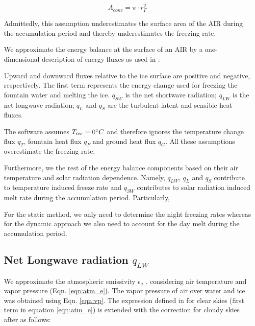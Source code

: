 \documentclass[tc, manuscript]{copernicus}
\begin{document}
\begin{equation} A_{cone} =\pi \cdot r_{F}^2 \label{eq:Area} \end{equation}

Admittedly, this assumption underestimates the surface area of the AIR during the accumulation period and
thereby underestimates the freezing rate.

We approximate the energy balance at the surface of an AIR by a one-dimensional description of energy fluxes as
used in \cite{balasubramanianInfluenceMeteorologicalConditions2022}:


Upward and downward fluxes relative to the ice surface are positive and negative, respectively. The first term
represents the energy change used for freezing the fountain water and melting the ice. $q_{SW}$ is the net
shortwave radiation; $q_{LW}$ is the net longwave radiation; $q_{L}$ and $q_{S}$ are the turbulent latent and
sensible heat fluxes. 

The software assumes $T_{ice} = 0 ^{\circ} C$ and therefore ignores the temperature change flux $q_{T}$, fountain
heat flux $q_{F}$ and ground heat flux $q_{G}$. All these assumptions overestimate the freezing rate.

Furthermore, we the rest of the energy balance components based on their air temperature and solar
radiation dependence. Namely, $q_{LW}$, $q_{L}$ and $q_{S}$ contribute to temperature induced freeze rate and
$q_{SW}$ contributes to solar radiation induced melt rate during the accumulation period.  Particularly,

For the static method, we only need to determine the night freezing rates whereas for the dynamic approach we
also need to account for the day melt during the accumulation period.

\subsection{Net Longwave radiation \texorpdfstring{$q_{LW}$}{Lg}} \label{sec:LW}

We approximate the atmospheric emissivity $\epsilon_a$ , considering air temperature and vapor pressure (Eqn.
\ref{eqn:atm_e}). The vapor pressure of air over water and ice was obtained using Eqn. \ref{eqn:vp}.  The
expression defined in \cite{brutsaertDerivableFormulaLongwave1975} for clear skies (first term in equation
\ref{eqn:atm_e}) is extended with the correction for cloudy skies after
\cite{brutsaertEvaporationAtmosphereTheory1982} as follows:
\end{document}

